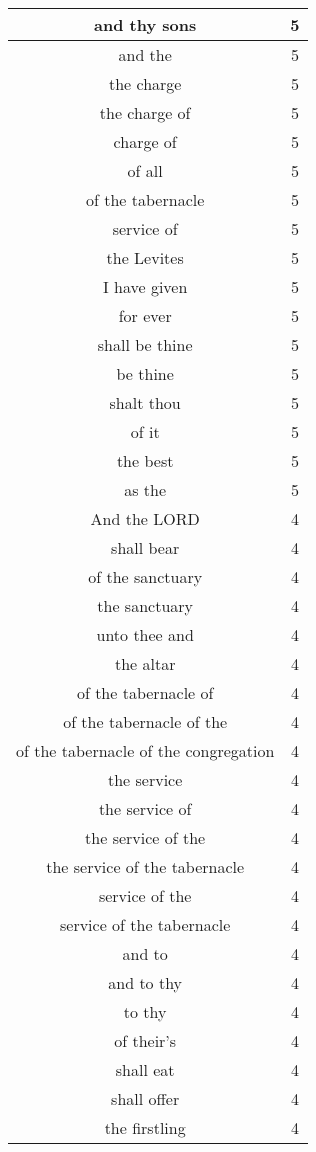 \begin{center}
\begin{longtable}{|c|c|}
and thy sons & 5\\ \hline 
and the & 5\\ \hline 
the charge & 5\\ \hline 
the charge of & 5\\ \hline 
charge of & 5\\ \hline 
of all & 5\\ \hline 
of the tabernacle & 5\\ \hline 
service of & 5\\ \hline 
the Levites & 5\\ \hline 
I have given & 5\\ \hline 
for ever & 5\\ \hline 
shall be thine & 5\\ \hline 
be thine & 5\\ \hline 
shalt thou & 5\\ \hline 
of it & 5\\ \hline 
the best & 5\\ \hline 
as the & 5\\ \hline 
And the LORD & 4\\ \hline 
shall bear & 4\\ \hline 
of the sanctuary & 4\\ \hline 
the sanctuary & 4\\ \hline 
unto thee and & 4\\ \hline 
the altar & 4\\ \hline 
of the tabernacle of & 4\\ \hline 
of the tabernacle of the & 4\\ \hline 
of the tabernacle of the congregation & 4\\ \hline 
the service & 4\\ \hline 
the service of & 4\\ \hline 
the service of the & 4\\ \hline 
the service of the tabernacle & 4\\ \hline 
service of the & 4\\ \hline 
service of the tabernacle & 4\\ \hline 
and to & 4\\ \hline 
and to thy & 4\\ \hline 
to thy & 4\\ \hline 
of their's & 4\\ \hline 
shall eat & 4\\ \hline 
shall offer & 4\\ \hline 
the firstling & 4\\ \hline 

\end{longtable}
\end{center}
